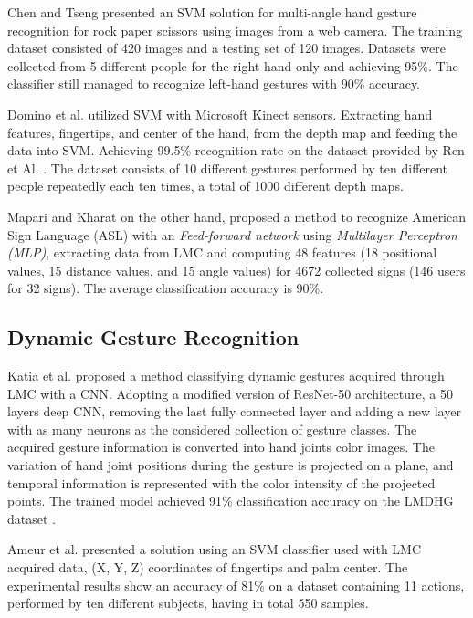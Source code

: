 Chen and Tseng \cite{chentseng} presented an SVM solution for multi-angle hand gesture recognition for rock paper scissors using images from a web camera. The training dataset consisted of 420 images and a testing set of 120 images. 
Datasets were collected from 5 different people for the right hand only and achieving 95\%. The classifier still managed to recognize left-hand gestures with 90\% accuracy. 

Domino et al. \cite{dominokinect} utilized SVM with Microsoft Kinect sensors. Extracting hand features, fingertips, and center of the hand, from the depth map and feeding the data into SVM. Achieving 99.5\% recognition rate on the dataset provided by Ren et Al. \cite{dominokinect_data}. The dataset consists of 10 different gestures performed by ten different people repeatedly each ten times, a total of 1000 different depth maps.

Mapari and Kharat \cite{mapari} on the other hand, proposed a method to recognize American Sign Language (ASL) with an \textit{Feed-forward network} using \textit{Multilayer Perceptron (MLP)}, extracting data from LMC and computing 48 features (18 positional values, 15 distance values, and 15 angle values) for 4672 collected signs (146 users for 32 signs). The average classification accuracy is 90\%.

\subsection{Dynamic Gesture Recognition}

Katia et al. \cite{katiacnn} proposed a method classifying dynamic gestures acquired through LMC with a CNN.
Adopting a modified version of ResNet-50 architecture, a 50 layers deep CNN, removing the last fully connected layer and adding a new layer with as many neurons as the considered collection of gesture classes. 
The acquired gesture information is converted into hand joints color images. The variation of hand joint positions during the gesture is projected on a plane, and temporal information is represented with the color intensity of the projected points. The trained model achieved 91\% classification accuracy on the LMDHG dataset \cite{lmdhg}.

Ameur et al. \cite{ameur} presented a solution using an SVM classifier used with LMC acquired data, (X, Y, Z) coordinates of fingertips and palm center. The experimental results show an accuracy of 81\% on a dataset containing 11 actions, performed by ten different subjects, having in total 550 samples.

